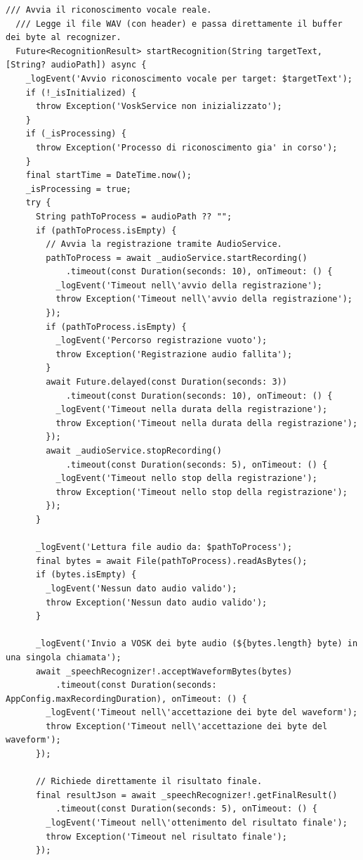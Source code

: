 \documentclass[14pt]{extbook}
\begin{document}
\begin{lstlisting}[caption=vosk\_service.dart, label=lst:VoskService]
  /// Avvia il riconoscimento vocale reale.
  /// Legge il file WAV (con header) e passa direttamente il buffer dei byte al recognizer.
  Future<RecognitionResult> startRecognition(String targetText, [String? audioPath]) async {
    _logEvent('Avvio riconoscimento vocale per target: $targetText');
    if (!_isInitialized) {
      throw Exception('VoskService non inizializzato');
    }
    if (_isProcessing) {
      throw Exception('Processo di riconoscimento gia' in corso');
    }
    final startTime = DateTime.now();
    _isProcessing = true;
    try {
      String pathToProcess = audioPath ?? "";
      if (pathToProcess.isEmpty) {
        // Avvia la registrazione tramite AudioService.
        pathToProcess = await _audioService.startRecording()
            .timeout(const Duration(seconds: 10), onTimeout: () {
          _logEvent('Timeout nell\'avvio della registrazione');
          throw Exception('Timeout nell\'avvio della registrazione');
        });
        if (pathToProcess.isEmpty) {
          _logEvent('Percorso registrazione vuoto');
          throw Exception('Registrazione audio fallita');
        }
        await Future.delayed(const Duration(seconds: 3))
            .timeout(const Duration(seconds: 10), onTimeout: () {
          _logEvent('Timeout nella durata della registrazione');
          throw Exception('Timeout nella durata della registrazione');
        });
        await _audioService.stopRecording()
            .timeout(const Duration(seconds: 5), onTimeout: () {
          _logEvent('Timeout nello stop della registrazione');
          throw Exception('Timeout nello stop della registrazione');
        });
      }

      _logEvent('Lettura file audio da: $pathToProcess');
      final bytes = await File(pathToProcess).readAsBytes();
      if (bytes.isEmpty) {
        _logEvent('Nessun dato audio valido');
        throw Exception('Nessun dato audio valido');
      }

      _logEvent('Invio a VOSK dei byte audio (${bytes.length} byte) in una singola chiamata');
      await _speechRecognizer!.acceptWaveformBytes(bytes)
          .timeout(const Duration(seconds: AppConfig.maxRecordingDuration), onTimeout: () {
        _logEvent('Timeout nell\'accettazione dei byte del waveform');
        throw Exception('Timeout nell\'accettazione dei byte del waveform');
      });

      // Richiede direttamente il risultato finale.
      final resultJson = await _speechRecognizer!.getFinalResult()
          .timeout(const Duration(seconds: 5), onTimeout: () {
        _logEvent('Timeout nell\'ottenimento del risultato finale');
        throw Exception('Timeout nel risultato finale');
      });


\end{lstlisting}
\end{document}
